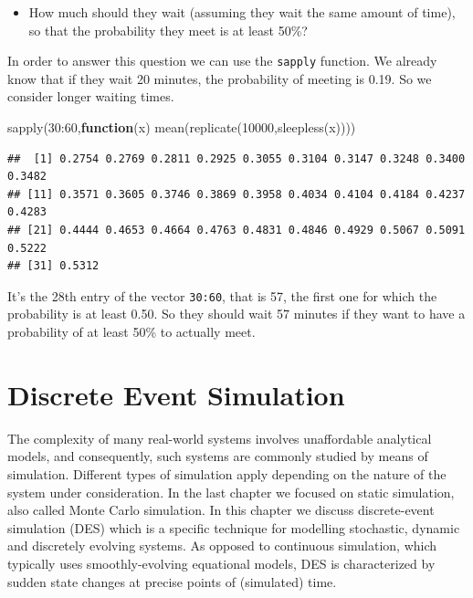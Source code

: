 \documentclass[
]{book}
\newenvironment{Shaded}{\begin{snugshade}}{\end{snugshade}}
\newcommand{\ControlFlowTok}[1]{\textcolor[rgb]{0.13,0.29,0.53}{\textbf{#1}}}
\newcommand{\DecValTok}[1]{\textcolor[rgb]{0.00,0.00,0.81}{#1}}
\newcommand{\FunctionTok}[1]{\textcolor[rgb]{0.00,0.00,0.00}{#1}}
\newcommand{\NormalTok}[1]{#1}
\newcommand{\SpecialCharTok}[1]{\textcolor[rgb]{0.00,0.00,0.00}{#1}}
\providecommand{\tightlist}{%
  \setlength{\itemsep}{0pt}\setlength{\parskip}{0pt}}
\begin{document}
\begin{itemize}
\tightlist
\item
  How much should they wait (assuming they wait the same amount of time), so that the probability they meet is at least 50\%?
\end{itemize}

In order to answer this question we can use the \texttt{sapply} function. We already know that if they wait 20 minutes, the probability of meeting is 0.19. So we consider longer waiting times.

\begin{Shaded}
\begin{Highlighting}[]
\FunctionTok{sapply}\NormalTok{(}\DecValTok{30}\SpecialCharTok{:}\DecValTok{60}\NormalTok{,}\ControlFlowTok{function}\NormalTok{(x) }\FunctionTok{mean}\NormalTok{(}\FunctionTok{replicate}\NormalTok{(}\DecValTok{10000}\NormalTok{,}\FunctionTok{sleepless}\NormalTok{(x))))}
\end{Highlighting}
\end{Shaded}

\begin{verbatim}
##  [1] 0.2754 0.2769 0.2811 0.2925 0.3055 0.3104 0.3147 0.3248 0.3400 0.3482
## [11] 0.3571 0.3605 0.3746 0.3869 0.3958 0.4034 0.4104 0.4184 0.4237 0.4283
## [21] 0.4444 0.4653 0.4664 0.4763 0.4831 0.4846 0.4929 0.5067 0.5091 0.5222
## [31] 0.5312
\end{verbatim}

It's the 28th entry of the vector \texttt{30:60}, that is 57, the first one for which the probability is at least 0.50. So they should wait 57 minutes if they want to have a probability of at least 50\% to actually meet.

\hypertarget{discrete-event-simulation}{%
\chapter{Discrete Event Simulation}\label{discrete-event-simulation}}

The complexity of many real-world systems involves unaffordable analytical models, and consequently, such systems are commonly studied by means of simulation. Different types of simulation apply depending on the nature of the system under consideration. In the last chapter we focused on static simulation, also called Monte Carlo simulation. In this chapter we discuss discrete-event simulation (DES) which is a specific technique for modelling stochastic, dynamic and discretely evolving systems. As opposed to continuous simulation, which typically uses smoothly-evolving equational models, DES is characterized by sudden state changes at precise points of (simulated) time.
\end{document}
